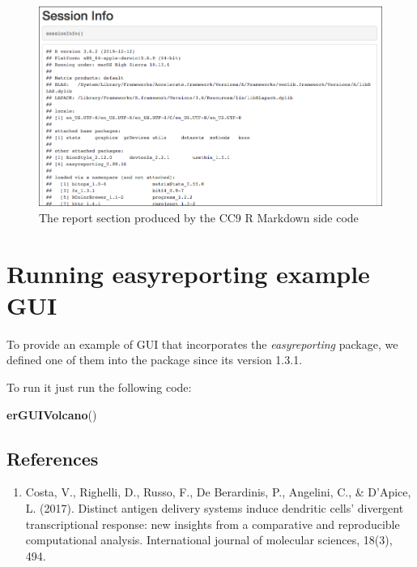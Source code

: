 \documentclass[]{article}
\newenvironment{Shaded}{\begin{snugshade}}{\end{snugshade}}
\newcommand{\KeywordTok}[1]{\textcolor[rgb]{0.13,0.29,0.53}{\textbf{#1}}}
\newcommand{\NormalTok}[1]{#1}
\providecommand{\tightlist}{%
  \setlength{\itemsep}{0pt}\setlength{\parskip}{0pt}}
\begin{document}
\begin{figure}[ht]

{\centering \includegraphics[width=0.95\linewidth]{imgs/9} 

}

\caption{The report section produced by the CC9 R Markdown side code}\label{fig:unnamed-chunk-20}
\end{figure}

\hypertarget{running-easyreporting-example-gui}{%
\section{Running easyreporting example
GUI}\label{running-easyreporting-example-gui}}

To provide an example of GUI that incorporates the \emph{easyreporting}
package, we defined one of them into the package since its version
1.3.1.

To run it just run the following code:

\begin{Shaded}
\begin{Highlighting}[]
\KeywordTok{erGUIVolcano}\NormalTok{()}
\end{Highlighting}
\end{Shaded}

\hypertarget{references}{%
\subsection{References}\label{references}}

\begin{enumerate}
\def\labelenumi{\arabic{enumi}.}
\tightlist
\item
  Costa, V., Righelli, D., Russo, F., De Berardinis, P., Angelini, C.,
  \& D'Apice, L. (2017). Distinct antigen delivery systems induce
  dendritic cells' divergent transcriptional response: new insights from
  a comparative and reproducible computational analysis. International
  journal of molecular sciences, 18(3), 494.
\end{enumerate}
\end{document}
